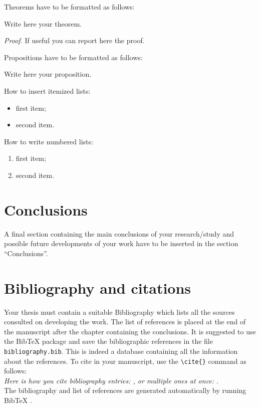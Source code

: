 \documentclass[11pt,a4paper]{article}
\begin{document}
Theorems have to be formatted as follows:
\begin{theorem}
\label{a_theorem}
Write here your theorem. 
\end{theorem}
\textit{Proof.} If useful you can report here the proof.
\vspace{0.3cm} %

Propositions have to be formatted as follows:
\begin{proposition}
Write here your proposition.
\end{proposition}
\vspace{0.3cm} 

How to insert itemized lists:
\begin{itemize}
    \item first item;
    \item second item.
\end{itemize}
How to write numbered lists:
\begin{enumerate}
    \item first item;
    \item second item.
\end{enumerate}

\section{Conclusions}
\color{black}
A final section containing the main conclusions of your research/study
and possible future developments of your work have to be inserted in the section ``Conclusions''.

\section{Bibliography and citations}
Your thesis must contain a suitable Bibliography which lists all the sources consulted on developing the work.
The list of references is placed at the end of the manuscript after the chapter containing the conclusions.
It is suggested to use the BibTeX package and save the bibliographic references in the file \verb|bibliography.bib|.
This is indeed a database containing all the information about the references. To cite in your manuscript, use the \verb|\cite{}| command as follows:
\\
\textit{Here is how you cite bibliography entries: \cite{knuth74}, or multiple ones at once: \cite{knuth92,lamport94}}.
\\
The bibliography and list of references are generated automatically by running BibTeX \cite{bibtex}.
\end{document}
